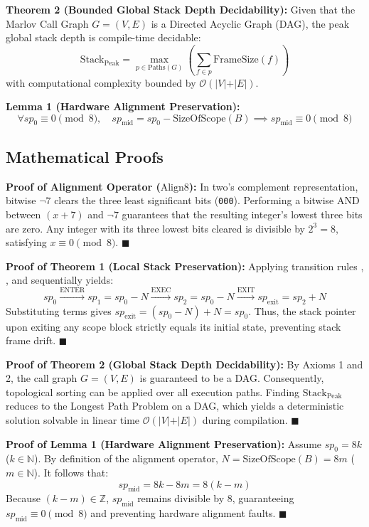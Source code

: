 \documentclass[conference]{IEEEtran}
\begin{document}
\textbf{Theorem 2 (Bounded Global Stack Depth Decidability):} 
Given that the Marlov Call Graph $G = (V, E)$ is a Directed Acyclic Graph (DAG), the peak global stack depth is compile-time decidable:
\[\mathrm{Stack}_{\mathrm{Peak}} = \max_{p \in \text{Paths}(G)} \left( \sum_{f \in p} \mathrm{FrameSize}(f) \right)\]
with computational complexity bounded by $\mathcal{O}(\vert{}V\vert{} + \vert{}E\vert{})$.

\textbf{Lemma 1 (Hardware Alignment Preservation):}
\[\forall sp_0 \equiv 0 \pmod 8, \quad sp_{\text{mid}} = sp_0 - \mathrm{SizeOfScope}(B) \implies sp_{\text{mid}} \equiv 0 \pmod 8\]

\subsection{Mathematical Proofs}

\textbf{Proof of Alignment Operator ($\mathrm{Align8}$):}
In two's complement representation, bitwise $\neg 7$ clears the three least significant bits (\texttt{000}). Performing a bitwise AND between $(x + 7)$ and $\neg 7$ guarantees that the resulting integer's lowest three bits are zero. Any integer with its three lowest bits cleared is divisible by $2^3 = 8$, satisfying $x \equiv 0 \pmod 8$. $\blacksquare$

\textbf{Proof of Theorem 1 (Local Stack Preservation):}
Applying transition rules \text{[E-ENTER]}, \text{[E-EXEC]}, and \text{[E-EXIT]} sequentially yields:
\[sp_0 \xrightarrow{\text{ENTER}} sp_1 = sp_0 - N \xrightarrow{\text{EXEC}} sp_2 = sp_0 - N \xrightarrow{\text{EXIT}} sp_{\text{exit}} = sp_2 + N\]
Substituting terms gives $sp_{\text{exit}} = (sp_0 - N) + N = sp_0$. Thus, the stack pointer upon exiting any scope block strictly equals its initial state, preventing stack frame drift. $\blacksquare$

\textbf{Proof of Theorem 2 (Global Stack Depth Decidability):}
By Axioms 1 and 2, the call graph $G = (V, E)$ is guaranteed to be a DAG. Consequently, topological sorting can be applied over all execution paths. Finding $\mathrm{Stack}_{\mathrm{Peak}}$ reduces to the Longest Path Problem on a DAG, which yields a deterministic solution solvable in linear time $\mathcal{O}(\vert{}V\vert{} + \vert{}E\vert{})$ during compilation. $\blacksquare$

\textbf{Proof of Lemma 1 (Hardware Alignment Preservation):}
Assume $sp_0 = 8k$ ($k \in \mathbb{N}$). By definition of the alignment operator, $N = \mathrm{SizeOfScope}(B) = 8m$ ($m \in \mathbb{N}$). It follows that:
\[sp_{\text{mid}} = 8k - 8m = 8(k - m)\]
Because $(k - m) \in \mathbb{Z}$, $sp_{\text{mid}}$ remains divisible by 8, guaranteeing $sp_{\text{mid}} \equiv 0 \pmod 8$ and preventing hardware alignment faults. $\blacksquare$
\end{document}
